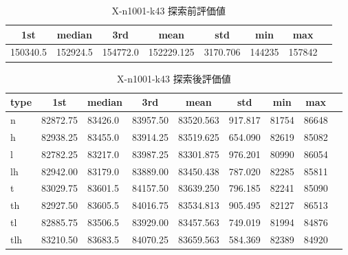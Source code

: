\begin{table}[htbp]
    \caption{X-n1001-k43 探索前評価値}
    \begin{tabular}{|l|l|l|l|l|l|l|l|}\hline
    \multicolumn{1}{|c|}{\textbf{1st}}
    &\multicolumn{1}{c|}{\textbf{median}}
    &\multicolumn{1}{c|}{\textbf{3rd}}
    &\multicolumn{1}{c|}{\textbf{mean}}
    &\multicolumn{1}{c|}{\textbf{std}}
    &\multicolumn{1}{c|}{\textbf{min}}
    &\multicolumn{1}{c|}{\textbf{max}}\\\hline
	150340.5 & 152924.5 & 154772.0 & 152229.125 & 3170.706 & 144235 & 157842\\\hline
	\end{tabular}
\end{table}
\begin{table}[htbp]
    \caption{X-n1001-k43 探索後評価値}
    \begin{tabular}{|l|l|l|l|l|l|l|l|l|}\hline
    \multicolumn{1}{|c|}{\textbf{type}}
    &\multicolumn{1}{|c|}{\textbf{1st}}
    &\multicolumn{1}{c|}{\textbf{median}}
    &\multicolumn{1}{c|}{\textbf{3rd}}
    &\multicolumn{1}{c|}{\textbf{mean}}
    &\multicolumn{1}{c|}{\textbf{std}}
    &\multicolumn{1}{c|}{\textbf{min}}
    &\multicolumn{1}{c|}{\textbf{max}}\\\hline
	n & 82872.75 & 83426.0 & 83957.50 & 83520.563 & 917.817 & 81754 & 86648\\\hline
	h & 82938.25 & 83455.0 & 83914.25 & 83519.625 & 654.090 & 82619 & 85082\\\hline
	l & 82782.25 & 83217.0 & 83987.25 & 83301.875 & 976.201 & 80990 & 86054\\\hline
	lh & 82942.00 & 83179.0 & 83889.00 & 83450.438 & 787.020 & 82285 & 85811\\\hline
	t & 83029.75 & 83601.5 & 84157.50 & 83639.250 & 796.185 & 82241 & 85090\\\hline
	th & 82927.50 & 83605.5 & 84016.75 & 83534.813 & 905.495 & 82127 & 86513\\\hline
	tl & 82885.75 & 83506.5 & 83929.00 & 83457.563 & 749.019 & 81994 & 84876\\\hline
	tlh & 83210.50 & 83683.5 & 84070.25 & 83659.563 & 584.369 & 82389 & 84920\\\hline
	\end{tabular}
\end{table}

